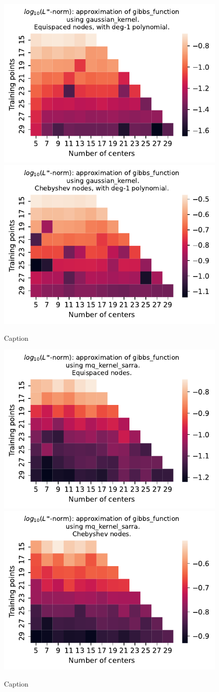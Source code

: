 \documentclass[12pt]{report} %
\begin{document}
\begin{figure}[ht]
    \centering
    
    \includegraphics[width=.49\textwidth]{imagenes/experiments/1d/variational/gibbs_function-Kgaussian_kernel-Poly-Equi.pdf}
    \includegraphics[width=.49\textwidth]{imagenes/experiments/1d/variational/gibbs_function-Kgaussian_kernel-Poly-Cheb.pdf}
    \caption{Caption}
    \label{fig:gibbs-gaussian-poly}
\end{figure}

\begin{figure}[ht]
    \centering
    
    \includegraphics[width=.49\textwidth]{imagenes/experiments/1d/variational/gibbs_function-Kmq_kernel_sarra-Equi.pdf}
    \includegraphics[width=.49\textwidth]{imagenes/experiments/1d/variational/gibbs_function-Kmq_kernel_sarra-Cheb.pdf}
    \caption{Caption}
    \label{fig:gibbs-sarra}
\end{figure}
\end{document}

